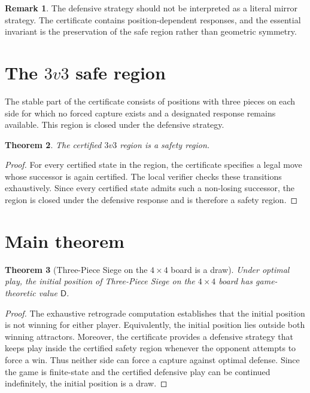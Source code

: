 \documentclass[11pt,a4paper]{article}
\theoremstyle{plain}
\newtheorem{theorem}{Theorem}[section]
\theoremstyle{definition}
\newtheorem{remark}[theorem]{Remark}
\newcommand{\Draw}{\mathsf{D}}
\begin{document}
\begin{remark}
The defensive strategy should not be interpreted as a literal mirror strategy. The certificate contains position-dependent responses, and the essential invariant is the preservation of the safe region rather than geometric symmetry.
\end{remark}

\section{The $3v3$ safe region}

The stable part of the certificate consists of positions with three pieces on each side for which no forced capture exists and a designated response remains available. This region is closed under the defensive strategy.

\begin{theorem}
The certified $3v3$ region is a safety region.
\end{theorem}

\begin{proof}
For every certified state in the region, the certificate specifies a legal move whose successor is again certified. The local verifier checks these transitions exhaustively. Since every certified state admits such a non-losing successor, the region is closed under the defensive response and is therefore a safety region.
\end{proof}

\section{Main theorem}

\begin{theorem}[Three-Piece Siege on the $4\times4$ board is a draw]
Under optimal play, the initial position of Three-Piece Siege on the $4\times4$ board has game-theoretic value $\Draw$.
\end{theorem}

\begin{proof}
The exhaustive retrograde computation establishes that the initial position is not winning for either player. Equivalently, the initial position lies outside both winning attractors. Moreover, the certificate provides a defensive strategy that keeps play inside the certified safety region whenever the opponent attempts to force a win. Thus neither side can force a capture against optimal defense. Since the game is finite-state and the certified defensive play can be continued indefinitely, the initial position is a draw.
\end{proof}
\end{document}
